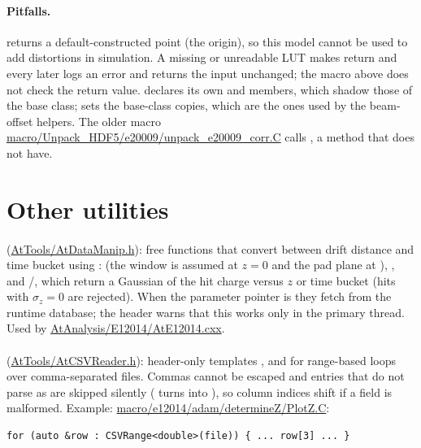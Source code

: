 \paragraph{Pitfalls.}
 returns a default-constructed point (the origin), so this model cannot be
used to add distortions in simulation. A missing or unreadable LUT makes  return
 and every later  logs an error and returns the input unchanged; the macro above
does not check the return value.  declares its own  and 
members, which shadow those of the base class;  sets the base-class copies, which are the ones
used by the beam-offset helpers. The older macro \url{macro/Unpack_HDF5/e20009/unpack_e20009_corr.C} calls
, a method that  does not have.

\section{Other utilities}
\label{sec:tools-misc}

\paragraph{} (\url{AtTools/AtDataManip.h}): free functions that convert between drift distance and
time bucket using :  (the window is assumed at $z = 0$ and the pad plane at
), , and /, which return a
Gaussian  of the hit charge versus $z$ or time bucket (hits with $\sigma_z = 0$ are rejected). When the
parameter pointer is  they fetch  from the runtime database; the header warns that this
works only in the primary thread. Used by \url{AtAnalysis/E12014/AtE12014.cxx}.

\paragraph{} (\url{AtTools/AtCSVReader.h}): header-only templates ,
 and  for range-based loops over comma-separated files. Commas cannot be escaped
and entries that do not parse as  are skipped silently ( turns  into
), so column indices shift if a field is malformed. Example: \url{macro/e12014/adam/determineZ/PlotZ.C}:
\begin{verbatim}
for (auto &row : CSVRange<double>(file)) { ... row[3] ... }
\end{verbatim}


